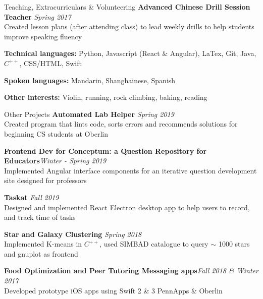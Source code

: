 \documentclass{resume}
\begin{document}
\begin{rSection}{Teaching, Extracurriculars \& Volunteering}
{\bf Advanced Chinese Drill Session Teacher} \hfill {\em Spring 2017} \\
{ Created lesson plans (after attending class) to lead weekly drills to help students improve speaking fluency}

\textbf{Technical languages:} {Python, Javascript (React \& Angular), LaTex, Git, Java, {$C^{++}$}, CSS/HTML, Swift}


\textbf{Spoken languages: }{Mandarin, Shanghainese, Spanish} 

{\bf Other interests: }{Violin, running, rock climbing, baking, reading}
\end{rSection}

\begin{rSection} {Other Projects}
{\bf Automated Lab Helper
}\hfill  {\em Spring 2019} \\
Created program that lints code, sorts errors and recommends solutions for beginning CS students at Oberlin

{\bf Frontend Dev for Conceptum: a Question Repository for Educators}\hfill  {\em Winter - Spring 2019} \\
Implemented Angular interface components for an iterative question development site designed for professors

{\bf Taskat 
}\hfill  {\em Fall 2019} \\
Designed and implemented {React} Electron desktop app to help users to record, and track time of tasks

{\bf Star and Galaxy Clustering 
}\hfill {\em Spring 2018} \\
{Implemented K-means in {$C^{++}$}, used SIMBAD catalogue to query $\sim$ 1000 stars and gnuplot as frontend}

\textbf{Food Optimization and Peer Tutoring Messaging apps}\hfill {\em Fall 2018 \& Winter 2017} \\
{ Developed prototype iOS apps using Swift 2 \& 3} \hfill { PennApps \& Oberlin}
\end{rSection}
\end{document}
